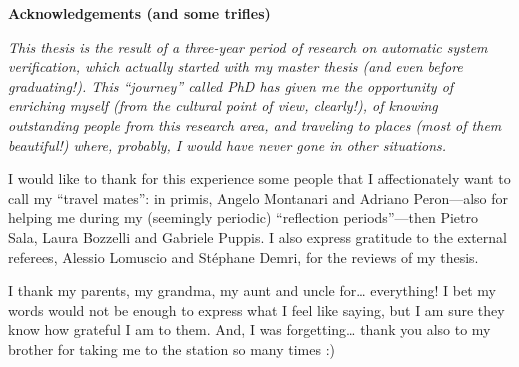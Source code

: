 \thispagestyle{empty}

\begin{center}
\bfseries Acknowledgements (and some trifles)
\end{center}

{\itshape
This thesis is the result of a three-year period of research on automatic system verification, which actually started with my master thesis (and even before graduating!).
This ``journey'' called PhD
has given me the opportunity of enriching myself (from the cultural point of view, clearly!), of knowing outstanding people from this research area, and traveling to places (most of them beautiful!) where, probably, I would have never gone in other situations.

I would like to thank for this experience some people that I affectionately want to call my ``travel mates'':
in primis, Angelo Montanari and Adriano Peron---also for helping me during my (seemingly periodic) ``reflection periods''---then Pietro Sala,
Laura Bozzelli and Gabriele Puppis.
I also express gratitude to the external referees, Alessio Lomuscio and 
Stéphane Demri, for the reviews of my 
thesis.

I thank my parents, my grandma, my aunt and uncle for\dots{} everything!
I bet my words would not be enough to express what I feel like saying,
but I am sure they know how grateful I am to them. %
And, I was forgetting\dots{} thank you also to my brother for taking me to the station so many times :)
}